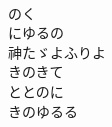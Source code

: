 \documentclass[10pt,b5j]{tarticle} %
\begin{document}
\begin{enumerate}
\begin{minipage}[c]{\blocksize}
    \end{minipage}
    \begin{minipage}[c]{\blocksize}
        
        \vspace{\linespace}
        \item~\\
        のく\\
        にゆるの\\
        神たゞよふりよ\\
        きのきて\\
        ととのに\\
        きのゆるる
    
    \end{minipage}
\end{enumerate} %
\end{document}
